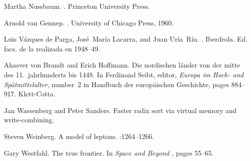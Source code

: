 \documentclass[book]{scrbook}
\begin{document}
\begin{thebibliography}{99}
Martha Nussbaum.
.
\newblock Princeton University Press.

Arnold van Gennep.
.
\newblock University of Chicago Press, 1960.

Luis V{\'a}zques{ de }Parga, Jos{\'e}~Mar{\'i}a Lacarra, and Juan
  Ur{\'i}a~R{\'i}u.
.
\newblock Iberdrola.
\newblock Ed. facs. de la realizada en 1948--49.

Ahasver von Brandt and Erich Hoffmann.
\newblock Die nordischen l{\"a}nder von der mitte des 11.~jahrhunderts bis
  1448.
\newblock In Ferdinand Seibt, editor, {\em Europa im Hoch- und
  Sp{\"a}tmittelalter}, number~2 in Handbuch der europ{\"a}ischen Geschichte,
  pages 884--917. Klett-Cotta.

Jan Wassenberg and Peter Sanders.
\newblock Faster radix sort via virtual memory and write-combining.

Steven Weinberg.
\newblock A model of leptons.
:1264--1266.

Gary Westfahl.
\newblock The true frontier.
\newblock In {\em Space and Beyond\/} \cite{westfahl:frontier}, pages 55--65.
\end{thebibliography}
\end{document}
